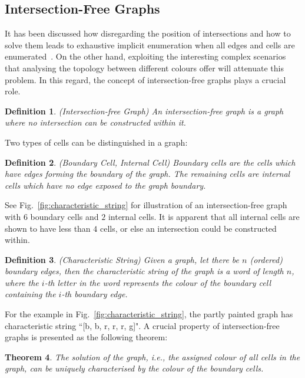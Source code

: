 \documentclass[journal]{IEEEtran}
\newtheorem{theorem}{Theorem}
\newtheorem{definition}[theorem]{Definition}
\begin{document}
\subsection{Intersection-Free Graphs}
It has been discussed how disregarding the position of intersections and how to solve them leads to exhaustive implicit enumeration when 
all edges and cells are enumerated~\cite{Yang2020Cellular}. 
On the other hand, exploiting the interesting complex scenarios that analysing the topology between different colours offer will attenuate 
this problem. In this regard, the concept of intersection-free graphs plays a crucial role.  

\begin{definition}
(Intersection-free Graph) An intersection-free graph is a graph where no intersection can be constructed within it. 
\end{definition}
Two types of cells can be distinguished in a graph: 
\begin{definition}
(Boundary Cell, Internal Cell) \textit{Boundary cells} are the cells which have edges forming the boundary of the graph. 
The remaining cells are \textit{internal cells} which have no edge exposed to the graph boundary. 
\end{definition}
See Fig.~\ref{fig:characteristic_string} for illustration of an intersection-free graph with $6$ boundary cells and $2$ internal cells. 
It is apparent that all internal cells are shown to have less than $4$ cells, or else an intersection could be constructed within. 


\begin{definition}
(Characteristic String) Given a graph, let there be $n$ (ordered) boundary edges, then the characteristic string of the graph is a word of length $n$, where the $i$-th letter in the word represents the colour of the boundary cell containing the $i$-th boundary edge. 
\end{definition}

For the example in Fig.~\ref{fig:characteristic_string}, the partly painted graph has characteristic string ``[b, b, r, r, r, g]". 
A crucial property of intersection-free graphs is presented as the following theorem:
\begin{theorem}\label{thm:string}
The solution of the graph, i.e., the assigned colour of all cells in the graph, can be uniquely characterised by the colour of the boundary cells. 
\end{theorem}
\end{document}
